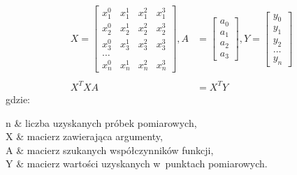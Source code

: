 \begin{equation}
	\begin{split}
		X = 	\begin{bmatrix}
		x_1^0&x_1^1&x_1^2&x_1^3\\
		x_2^0&x_2^1&x_2^2&x_2^3\\
		x_3^0&x_3^1&x_3^2&x_3^3\\
		\dots\\
		x_n^0&x_n^1&x_n^2&x_n^3
		\end{bmatrix} ,
		A &= 	\begin{bmatrix}
		a_0\\a_1\\a_2\\a_3
		\end{bmatrix} ,
		Y = 
		\begin{bmatrix}
			y_0 \\y_1\\y_2\\\dots\\y_n
		\end{bmatrix} \\
		& \\
		X^TXA &= X^TY
	\end{split}
	\label{eq:characteristics:kinect:distanceAccuracyPoly}
\end{equation}
gdzie:
\begin{conditions}
	n			& liczba uzyskanych próbek pomiarowych,\\
	X			& macierz zawierająca argumenty,\\
	A			& macierz szukanych współczynników funkcji,\\
	Y			& macierz wartości uzyskanych w~punktach pomiarowych.\\
\end{conditions}

